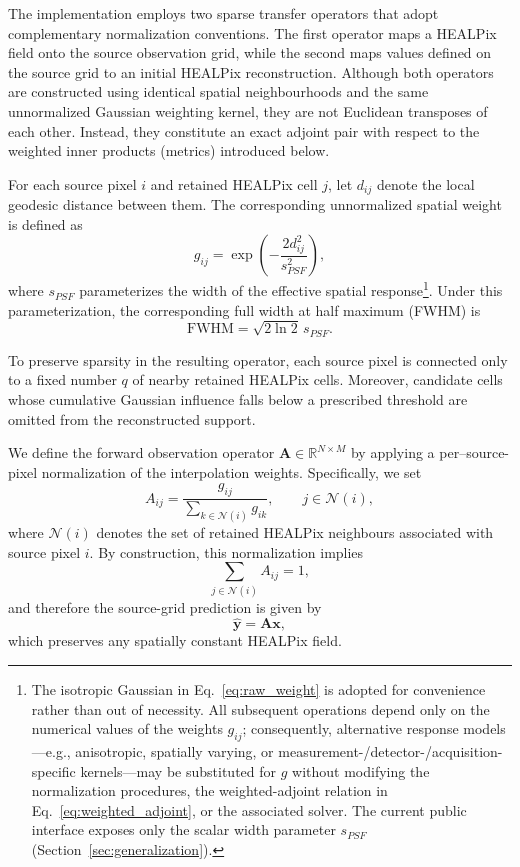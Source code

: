 \documentclass[journal]{IEEEtran}
\newcommand{\healpix}{HEALPix\xspace}
\newcommand{\psf}{PSF\xspace}
\begin{document}
The implementation employs two sparse transfer operators that adopt complementary normalization conventions. The first operator maps a \healpix field onto the source observation grid, while the second maps values defined on the source grid to an initial \healpix reconstruction. Although both operators are constructed using identical spatial neighbourhoods and the same unnormalized Gaussian weighting kernel, they are not Euclidean transposes of each other. Instead, they constitute an exact adjoint pair with respect to the weighted inner products (metrics) introduced below.

For each source pixel $i$ and retained \healpix cell $j$, let $d_{ij}$ denote the local geodesic distance between them. The corresponding unnormalized spatial weight is defined as
\begin{equation}
g_{ij}
=
\exp\left(
-\frac{2d_{ij}^{2}}{s_{\psf}^{2}}
\right),
\label{eq:raw_weight}
\end{equation}
where $s_{\psf}$ parameterizes the width of the effective spatial response\footnote{The isotropic Gaussian in Eq.~\eqref{eq:raw_weight} is adopted for convenience rather than out of necessity. All subsequent operations depend only on the numerical values of the weights $g_{ij}$; consequently, alternative response models—e.g., anisotropic, spatially varying, or measurement-/detector-/acquisition-specific kernels—may be substituted for $g$ without modifying the normalization procedures, the weighted-adjoint relation in Eq.~\eqref{eq:weighted_adjoint}, or the associated solver. The current public interface exposes only the scalar width parameter $s_{PSF}$ (Section~\ref{sec:generalization}).}. Under this parameterization, the corresponding full width at half maximum (FWHM) is
\begin{equation}
\mathrm{FWHM}
=
\sqrt{2\ln 2}\,s_{\psf}.
\label{eq:fwhm_code}
\end{equation}

To preserve sparsity in the resulting operator, each source pixel is connected only to a fixed number $q$ of nearby retained \healpix cells. Moreover, candidate cells whose cumulative Gaussian influence falls below a prescribed threshold are omitted from the reconstructed support.

We define the forward observation operator $\mathbf{A}\in\mathbb{R}^{N\times M}$ by applying a per–source-pixel normalization of the interpolation weights. Specifically, we set
\begin{equation}
A_{ij}
=
\frac{g_{ij}}
{\displaystyle
 \sum_{k\in\mathcal{N}(i)}g_{ik}},
\qquad
j\in\mathcal{N}(i),
\label{eq:forward_operator}
\end{equation}
where $\mathcal{N}(i)$ denotes the set of retained \healpix neighbours associated with source pixel $i$. By construction, this normalization implies
\begin{equation}
\sum_{j\in\mathcal{N}(i)} A_{ij}=1,
\end{equation}
and therefore the source-grid prediction is given by
\begin{equation}
\widehat{\mathbf{y}}
=
\mathbf{A}\mathbf{x},
\label{eq:forward_prediction}
\end{equation}
which preserves any spatially constant \healpix field.
\end{document}
